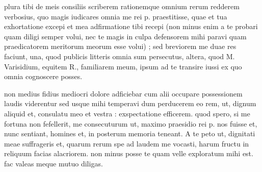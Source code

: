 


 plura tibi de meis consiliis scriberem rationemque omnium rerum redderem verbosius, quo magis iudicares omnia me rei p. praestitisse, quae et tua exhortatione excepi et mea adfirmatione tibi recepi (non minus enim a te probari quam diligi semper volui, nec te magis in culpa defensorem mihi paravi quam praedicatorem meritorum meorum esse volui) ; sed breviorem me duae res faciunt, una, quod publicis litteris omnia sum persecutus, altera, quod M. Varisidium, equitem R., familiarem meum, ipsum ad te transire iussi ex quo omnia cognoscere posses.

 non medius fidius mediocri dolore adficiebar cum alii occupare possessionem laudis viderentur sed usque mihi temperavi dum perducerem eo rem, ut, dignum aliquid et, consulatu meo et vestra : exspectatione efficerem. quod spero, si me fortuna non fefellerit, me consecuturum ut, maximo praesidio rei p. nos fuisse et, nunc sentiant, homines et, in posterum memoria teneant. A te peto ut, dignitati meae suffrageris et, quarum rerum spe ad laudem me vocasti, harum fructu in reliquum facias alacriorem. non minus posse te quam velle exploratum mihi est. fac valeas meque mutuo diligas.
